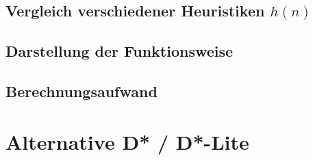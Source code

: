 		
		
	
	\subsection{Vergleich verschiedener Heuristiken $h(n)$}
		\cite{Patel2016}
	
	\subsection{Darstellung der Funktionsweise}
	

	
	\subsection{Berechnungsaufwand}
	

	
\section{Alternative D* / D*-Lite}
\cite{DStarAlg}
\cite{Koenig2005}



